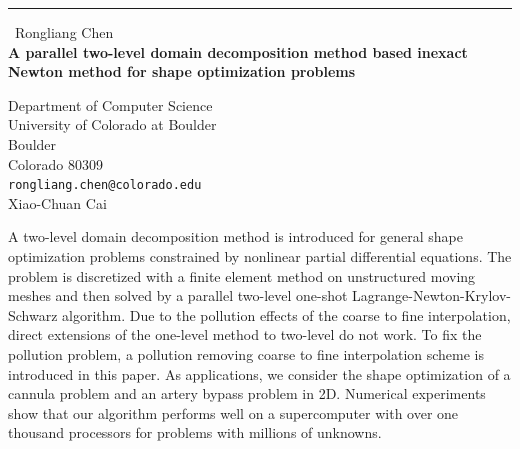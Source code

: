 \documentclass{report}
\begin{document}
\begin{center}
\rule{6in}{1pt} \
{\large Rongliang Chen \\
{\bf A parallel two-level domain decomposition method based inexact Newton method for shape optimization problems}}

Department of Computer Science \\ University of Colorado at Boulder \\ Boulder \\ Colorado 80309
\\
{\tt rongliang.chen@colorado.edu}\\
Xiao-Chuan Cai\end{center}

A two-level domain decomposition method is introduced for general shape
optimization problems constrained by nonlinear partial differential
equations. The problem is discretized with a finite element method on
unstructured moving meshes and then solved by a parallel two-level
one-shot Lagrange-Newton-Krylov-Schwarz algorithm. Due to the pollution
effects of the coarse to fine interpolation, direct extensions of the
one-level method to two-level do not work. To fix the pollution problem,
a pollution removing coarse to fine interpolation scheme is introduced in
this paper. As applications, we consider the shape optimization of a
cannula problem and an artery bypass problem in 2D. Numerical experiments
show that our algorithm performs well on a supercomputer with over one
thousand processors for problems with millions of unknowns.
\end{document}
